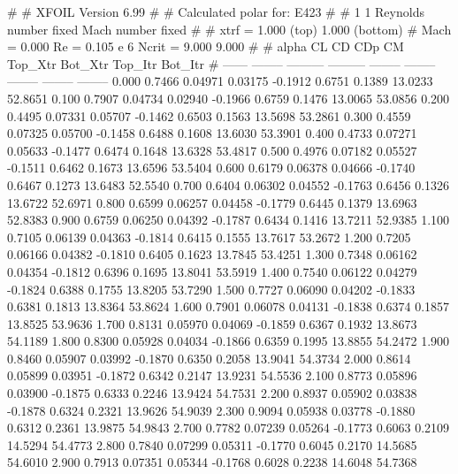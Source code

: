 #  
#       XFOIL         Version 6.99
#  
# Calculated polar for: E423                                            
#  
# 1 1 Reynolds number fixed          Mach number fixed         
#  
# xtrf =   1.000 (top)        1.000 (bottom)  
# Mach =   0.000     Re =     0.105 e 6     Ncrit =   9.000  9.000
#  
#   alpha    CL        CD       CDp       CM     Top_Xtr  Bot_Xtr  Top_Itr  Bot_Itr
#  ------ -------- --------- --------- -------- -------- -------- -------- --------
   0.000   0.7466   0.04971   0.03175  -0.1912   0.6751   0.1389  13.0233  52.8651
   0.100   0.7907   0.04734   0.02940  -0.1966   0.6759   0.1476  13.0065  53.0856
   0.200   0.4495   0.07331   0.05707  -0.1462   0.6503   0.1563  13.5698  53.2861
   0.300   0.4559   0.07325   0.05700  -0.1458   0.6488   0.1608  13.6030  53.3901
   0.400   0.4733   0.07271   0.05633  -0.1477   0.6474   0.1648  13.6328  53.4817
   0.500   0.4976   0.07182   0.05527  -0.1511   0.6462   0.1673  13.6596  53.5404
   0.600   0.6179   0.06378   0.04666  -0.1740   0.6467   0.1273  13.6483  52.5540
   0.700   0.6404   0.06302   0.04552  -0.1763   0.6456   0.1326  13.6722  52.6971
   0.800   0.6599   0.06257   0.04458  -0.1779   0.6445   0.1379  13.6963  52.8383
   0.900   0.6759   0.06250   0.04392  -0.1787   0.6434   0.1416  13.7211  52.9385
   1.100   0.7105   0.06139   0.04363  -0.1814   0.6415   0.1555  13.7617  53.2672
   1.200   0.7205   0.06166   0.04382  -0.1810   0.6405   0.1623  13.7845  53.4251
   1.300   0.7348   0.06162   0.04354  -0.1812   0.6396   0.1695  13.8041  53.5919
   1.400   0.7540   0.06122   0.04279  -0.1824   0.6388   0.1755  13.8205  53.7290
   1.500   0.7727   0.06090   0.04202  -0.1833   0.6381   0.1813  13.8364  53.8624
   1.600   0.7901   0.06078   0.04131  -0.1838   0.6374   0.1857  13.8525  53.9636
   1.700   0.8131   0.05970   0.04069  -0.1859   0.6367   0.1932  13.8673  54.1189
   1.800   0.8300   0.05928   0.04034  -0.1866   0.6359   0.1995  13.8855  54.2472
   1.900   0.8460   0.05907   0.03992  -0.1870   0.6350   0.2058  13.9041  54.3734
   2.000   0.8614   0.05899   0.03951  -0.1872   0.6342   0.2147  13.9231  54.5536
   2.100   0.8773   0.05896   0.03900  -0.1875   0.6333   0.2246  13.9424  54.7531
   2.200   0.8937   0.05902   0.03838  -0.1878   0.6324   0.2321  13.9626  54.9039
   2.300   0.9094   0.05938   0.03778  -0.1880   0.6312   0.2361  13.9875  54.9843
   2.700   0.7782   0.07239   0.05264  -0.1773   0.6063   0.2109  14.5294  54.4773
   2.800   0.7840   0.07299   0.05311  -0.1770   0.6045   0.2170  14.5685  54.6010
   2.900   0.7913   0.07351   0.05344  -0.1768   0.6028   0.2238  14.6048  54.7368
